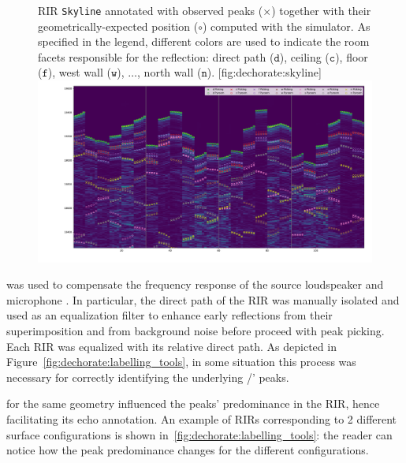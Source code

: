 \begin{figure}
    \begin{sidecaption}[]{
        \ac{RIR} \texttt{Skyline} annotated with observed peaks ($\times$) together with their geometrically-expected position ($\circ{}$) computed with the  simulator.
        As specified in the legend, different colors are used to indicate the room facets responsible for the reflection: direct path ($\mathtt{d}$), ceiling ($\mathtt{c}$), floor ($\mathtt{f}$), west wall ($\mathtt{w}$), $\dots$, north wall ($\mathtt{n}$).
    }[fig:dechorate:skyline]
    \centering
    \includegraphics[trim={15em 15em 2em 0},clip,width=\linewidth]{figures/dechorate/rir_skyline_final_mod4paper.pdf}
    \end{sidecaption}
\end{figure}

 was used to compensate the frequency response of the source loudspeaker and microphone . In particular, the direct path of the RIR was manually isolated and used as an equalization filter to enhance early reflections from their superimposition and from background noise before proceed with peak picking. Each RIR was equalized with its relative direct path. As depicted in Figure~\ref{fig:dechorate:labelling_tools}, in some situation this process was necessary for correctly identifying the underlying \TOAs/' peaks.

 for the same geometry influenced the peaks' predominance in the \ac{RIR}, hence facilitating its echo annotation.
An example of \acp{RIR} corresponding to 2 different surface configurations is shown in~\cref{fig:dechorate:labelling_tools}: the reader can notice how the peak predominance changes for the different configurations.


